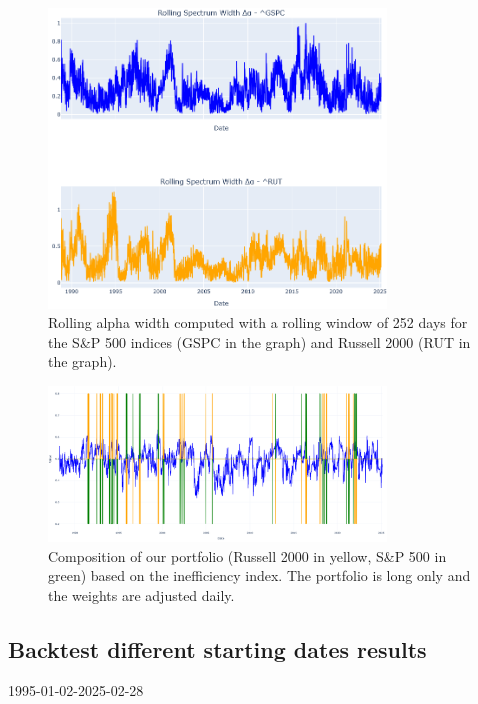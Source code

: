 \documentclass[11pt]{extarticle}
\begin{document}
\begin{figure}[ht]
    \centering
    \includegraphics[width=0.8\textwidth]{img/rolling_alpha_width.png}
    \caption{Rolling alpha width computed with a rolling window of 252 days
        for the S\&P 500 indices (GSPC in the graph) and Russell 2000 (RUT in the graph).}
    \label{fig:rolling_alpha_width}
\end{figure}
\FloatBarrier


\begin{figure}[ht]
    \centering
    \includegraphics[width=0.8\textwidth]{img/position_switching.png}
    \caption{Composition of our portfolio
        (Russell 2000 in yellow, S\&P 500 in green) based on the inefficiency index.
        The portfolio is long only and the weights are adjusted daily.}
    \label{fig:position_switching}
\end{figure}
\FloatBarrier

\subsection{Backtest different starting dates results}

\begin{table}[!h]
    \centering
    \caption{1995-01-02-2025-02-28}
    \label{tab:performance_table_1995-01-02}
\end{table}
\end{document}
